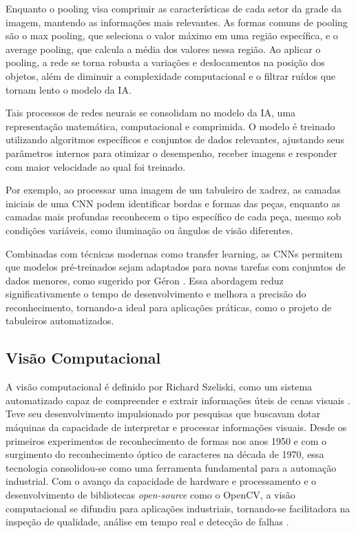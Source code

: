 \documentclass[journal]{IEEEtran} %
\begin{document}
Enquanto o pooling visa comprimir as características de cada setor da grade da imagem, mantendo as informações mais relevantes. As formas comuns de pooling são o max pooling, que seleciona o valor máximo em uma região específica, e o average pooling, que calcula a média dos valores nessa região. Ao aplicar o pooling, a rede se torna robusta a variações e deslocamentos na posição dos objetos, além de diminuir a complexidade computacional e o filtrar ruídos que tornam lento o modelo da IA.

Tais processos de redes neurais se consolidam no modelo da IA, uma representação matemática, computacional e comprimida. O modelo é treinado utilizando algoritmos específicos e conjuntos de dados relevantes, ajustando seus parâmetros internos para otimizar o desempenho, receber imagens e responder com maior velocidade ao qual foi treinado. 

Por exemplo, ao processar uma imagem de um tabuleiro de xadrez, as camadas iniciais de uma CNN podem identificar bordas e formas das peças, enquanto as camadas mais profundas reconhecem o tipo específico de cada peça, mesmo sob condições variáveis, como iluminação ou ângulos de visão diferentes.

Combinadas com técnicas modernas como transfer learning, as CNNs permitem que modelos pré-treinados sejam adaptados para novas tarefas com conjuntos de dados menores, como sugerido por Géron \cite{geron2019hands}. Essa abordagem reduz significativamente o tempo de desenvolvimento e melhora a precisão do reconhecimento, tornando-a ideal para aplicações práticas, como o projeto de tabuleiros automatizados.

\subsection{Visão Computacional}

A visão computacional é definido por Richard Szeliski, como um sistema automatizado capaz de compreender e extrair informações úteis de cenas visuais \cite{szeliski2010}. Teve seu desenvolvimento impulsionado por pesquisas que buscavam dotar máquinas da capacidade de interpretar e processar informações visuais. Desde os primeiros experimentos de reconhecimento de formas nos anos 1950 e com o surgimento do reconhecimento óptico de caracteres na década de 1970, essa tecnologia consolidou-se como uma ferramenta fundamental para a automação industrial. Com o avanço da capacidade de hardware e processamento e o desenvolvimento de bibliotecas \textit{open-source} como o OpenCV, a visão computacional se difundiu para aplicações industriais, tornando-se facilitadora na inspeção de qualidade, análise em tempo real e detecção de falhas \cite{opencv_library}. 
\end{document}
